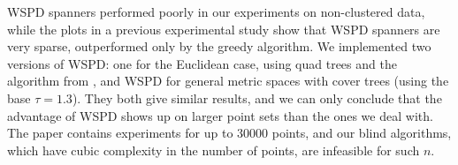 \documentclass{ws-ijcga}
\newcommand{\ignore}[1]{}
\begin{document}
WSPD spanners performed poorly in our experiments
on non-clustered data, while the plots in a previous experimental study \cite{farshi2009experimental}
show that WSPD spanners are very sparse, outperformed only by the greedy algorithm.
We implemented two versions of  WSPD: one for the Euclidean case,
using quad trees and the algorithm from \cite{hp-book}, and WSPD for general metric
spaces with cover trees (using the base $\tau=1.3$). 
They both give similar results, and we can only conclude
that the advantage of WSPD shows up on larger point sets than the ones we deal with.
The paper \cite{farshi2009experimental} contains experiments for up to 30000 points,
and our blind algorithms, which have cubic complexity in the number of points,
are infeasible for such $n$.



\end{document}
